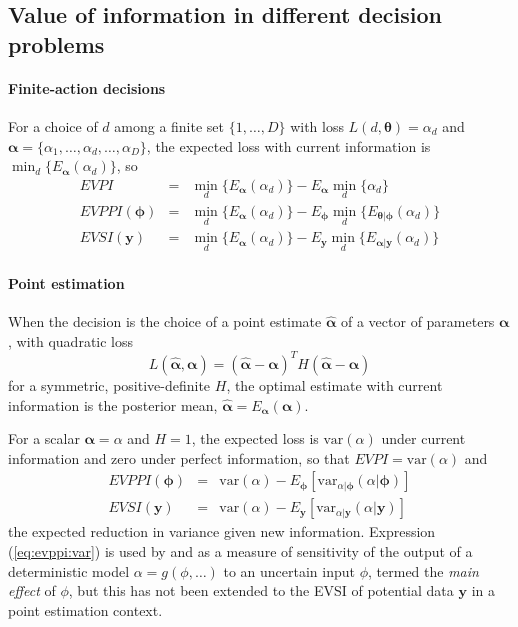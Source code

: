 \documentclass[12pt]{article}\usepackage[]{graphicx}\usepackage[]{color}
\newcommand{\var}{\mbox{var}}
\newcommand{\y}{\mathbf{y}}
\begin{document}
\subsection{Value of information in different decision problems}
\label{sec:voi:specific}

\paragraph{Finite-action decisions}
 For a choice of $d$ among a finite set $\{1,\ldots,D\}$
with loss $L(d,{\bm\theta}) = \alpha_d$ and $\bm\alpha = \{\alpha_1,\ldots,\alpha_d,\ldots,\alpha_D\}$, the expected loss
  with current information is $\min_d \{ E_{\bm\alpha}(\alpha_d) \}$, so \citep{raiffa:schlaifer}
  \begin{eqnarray}
EVPI  & = & \min_d \{ E_{\bm\alpha}(\alpha_d) \} - E_{\bm\alpha} \min_d\{\alpha_d\} \nonumber\\
\label{eq:evppi:decision}
EVPPI(\bm\phi)  & = & \min_d \{ E_{\bm\alpha}(\alpha_d) \} - E_{\bm\phi} \min_d\{E_{\bm\theta|\bm\phi}(\alpha_d)\} \\
EVSI(\y)  & = & \min_d \{ E_{\bm\alpha}(\alpha_d) \} - E_\y \min_d\{E_{{\bm\alpha}|\y}(\alpha_d)\} \nonumber
  \end{eqnarray}

\paragraph{Point estimation}
When the decision is the choice of a point estimate $\hat{\bm\alpha}$
  of a vector of parameters $\bm\alpha$, with quadratic loss
  \begin{equation}
    \label{eq:quadloss}
  L(\hat{\bm\alpha},\bm\alpha) = (\hat{\bm\alpha} - \bm\alpha)^T H (\hat{\bm\alpha} -
  \bm\alpha)
  \end{equation}
  for a symmetric, positive-definite $H$, the optimal estimate with current information is the
  posterior mean, $\hat{\bm\alpha} = E_{\bm\alpha}(\bm\alpha)$.  
  
  For a scalar $\bm\alpha=\alpha$ and $H=1$, the
  expected loss is $\var(\alpha)$ under current information and zero
  under perfect information, so that $EVPI=\var(\alpha)$ and
  \begin{eqnarray}
    EVPPI(\bm\phi) & =  & \var(\alpha) - E_{\bm\phi}\left[\var_{\alpha|\bm\phi}(\alpha | \bm\phi)\right] \label{eq:evppi:var}\\
    EVSI(\y) & = &  \var(\alpha) - E_{\y}\left[\var_{\alpha|\y}(\alpha | \y)\right] \label{eq:evsi:var}
  \end{eqnarray}
  the expected reduction in variance given new information.
  Expression (\ref{eq:evppi:var}) is used by \citet{oakley:ohagan:psa} and
  \citet{saltelli2004sensitivity} as a measure of sensitivity of the
  output of a deterministic model $\alpha = g(\phi,\ldots)$ to an
  uncertain input $\phi$, termed the \emph{main effect} of $\phi$, but
  this has not been extended to the EVSI of potential
  data $\y$ in a point estimation context.  
\end{document}
